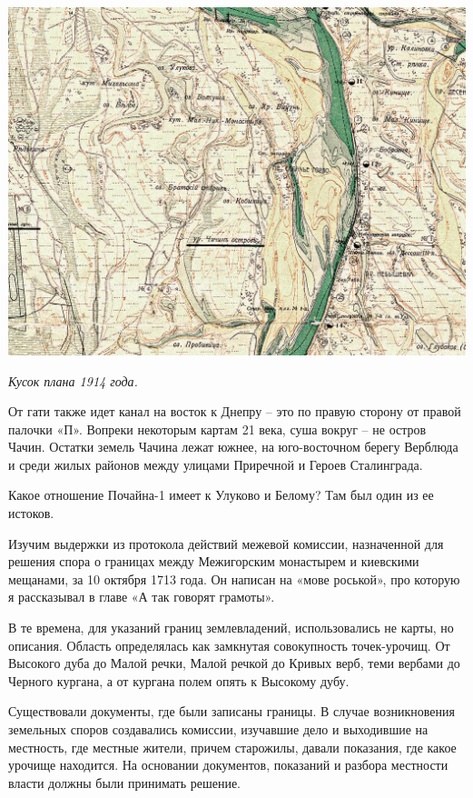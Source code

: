\begin{center}
\includegraphics[width=\linewidth]{chast-colebanie-osnov/pochayna/itsunsrc.jpg}

\textit{Кусок плана 1914 года.}
\end{center}

От гати также идет канал на восток к Днепру – это по правую сторону от правой палочки «П». Вопреки некоторым картам 21 века, суша вокруг – не остров Чачин. Остатки земель Чачина лежат южнее, на юго-восточном берегу Верблюда и среди жилых районов между улицами Приречной и Героев Сталинграда.

Какое отношение Почайна-1 имеет к Улуково и Белому? Там был один из ее истоков. 

Изучим выдержки из протокола действий межевой комиссии, назначенной для решения спора о границах между Межигорским монастырем и киевскими мещанами, за 10 октября 1713 года\cite{sbornikmat}. Он написан на «мове роськой», про которую я рассказывал в главе «А так говорят грамоты».

В те времена, для указаний границ землевладений, использовались не карты, но описания. Область определялась как замкнутая совокупность точек-урочищ. От Высокого дуба до Малой речки, Малой речкой до Кривых верб, теми вербами до Черного кургана, а от кургана полем опять к Высокому дубу.

Существовали документы, где были записаны границы. В случае возникновения земельных споров создавались комиссии, изучавшие дело и выходившие на местность, где местные жители, причем старожилы, давали показания, где какое урочище находится. На основании документов, показаний и разбора местности власти должны были принимать решение.

